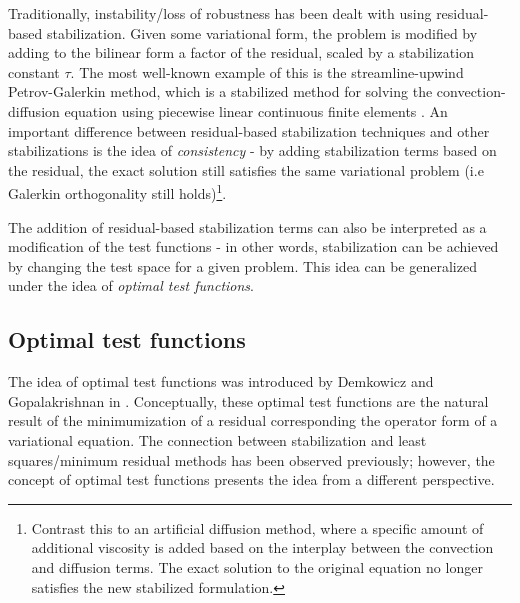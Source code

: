 \documentclass[11pt,onecolumn]{scrartcl}
\begin{document}
Traditionally, instability/loss of robustness has been dealt with using residual-based stabilization.  Given some variational form, the problem is modified by adding to the bilinear form a factor of the residual, scaled by a stabilization constant $\tau$.  The most well-known example of this is the streamline-upwind Petrov-Galerkin method, which is a stabilized method for solving the convection-diffusion equation using piecewise linear continuous finite elements \cite{SUPG}.  An important difference between residual-based stabilization techniques and other stabilizations is the idea of \textit{consistency} - by adding stabilization terms based on the residual, the exact solution still satisfies the same variational problem (i.e Galerkin orthogonality still holds)\footnote{Contrast this to an artificial diffusion method, where a specific amount of additional viscosity is added based on the interplay between the convection and diffusion terms. The exact solution to the original equation no longer satisfies the new stabilized formulation.}.

The addition of residual-based stabilization terms can also be interpreted as a modification of the test functions - in other words, stabilization can be achieved by changing the test space for a given problem.  This idea can be generalized under the idea of \textit{optimal test functions}.  


\subsection{Optimal test functions}
The idea of optimal test functions was introduced by Demkowicz and Gopalakrishnan in \cite{DPG2}.  Conceptually, these optimal test functions are the natural result of the minimumization of a residual corresponding the operator form of a variational equation. The connection between stabilization and least squares/minimum residual methods has been observed previously; however, the concept of optimal test functions presents the idea from a different perspective.
\end{document}
